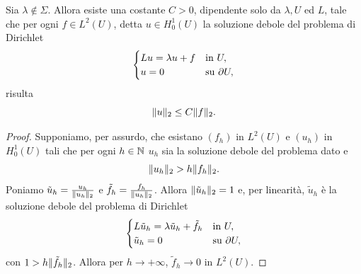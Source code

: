 \begin{corollario}
	Sia $\lambda \notin \Sigma$. Allora esiste una costante $C>0$, dipendente solo da $\lambda, U$ ed $L$, tale che per ogni $f \in L^2(U)$, detta $u \in H^1_0(U)$ la soluzione debole del problema di Dirichlet
	\[ \begin{cases}
		Lu= \lambda u + f & \textup{in } U,\\
		u=0 & \textup{su } \partial U, 
	\end{cases} \]
	risulta
	\[ \lVert u\rVert_2 \le C\lVert f\rVert_2. \]
\end{corollario}
\begin{proof}
	Supponiamo, per assurdo, che esistano $(f_h)$ in $L^2(U)$ e $(u_h)$ in $H^1_0(U)$ tali che per ogni $h \in \mathbb{N}$ $u_h$ sia la soluzione debole del problema dato e 
	\[ \lVert u_h\rVert_2 > h\lVert f_h\rVert_2. \]
	Poniamo $\tilde{u}_h = \frac{u_h}{\lVert u_h\rVert_2}$ e $\tilde{f}_h = \frac{f_h}{\lVert u_h\rVert_2}$. Allora $\lVert\tilde{u}_h\rVert_2=1$ e, per linearità, $\tilde{u}_h$ è la soluzione debole del problema di Dirichlet
	\[ \begin{cases}
		L\tilde{u}_h= \lambda \tilde{u}_h + \tilde{f}_h & \textup{in } U,\\
		\tilde{u}_h=0 & \textup{su } \partial U, 
	\end{cases} \]
	con $1 > h\lVert\tilde{f}_h \rVert_2$. Allora per $h \to +\infty$, $\tilde{f}_h \to 0$ in $L^2(U)$. 
	

\end{proof}
